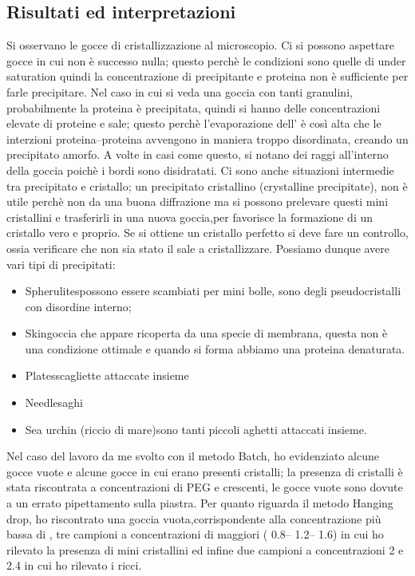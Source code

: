 \documentclass[twocolumn,a4paper,10pt]{my_report}
\begin{document}
{\subsection*{Risultati ed interpretazioni}
Si osservano le gocce di cristallizzazione al microscopio. Ci si possono aspettare gocce in cui non è successo nulla; questo perchè le condizioni sono quelle di under saturation quindi la concentrazione di precipitante e proteina non è sufficiente per farle precipitare.
Nel caso in cui si veda una goccia con tanti granulini, probabilmente la proteina è precipitata, quindi si hanno delle concentrazioni elevate di proteine e sale; questo perchè l'evaporazione dell'  è così alta che le interzioni proteina--proteina avvengono in maniera troppo disordinata, creando un precipitato amorfo. A volte in casi come questo, si notano dei raggi all'interno della goccia poichè i bordi sono disidratati. Ci sono anche situazioni intermedie tra precipitato e cristallo; un precipitato cristallino (crystalline precipitate), non è utile perchè non da una buona diffrazione ma si possono prelevare questi mini cristallini e trasferirli in una nuova goccia,per favorisce la formazione di un cristallo vero e proprio.
Se si ottiene un cristallo perfetto si deve fare un controllo, ossia verificare che non sia stato il sale a cristallizzare.
Possiamo dunque avere vari tipi di precipitati:
\begin{itemize}
 \item Spherulites\textrightarrow possono essere scambiati per mini bolle, sono degli pseudocristalli con disordine interno;
 \item Skin\textrightarrow goccia che appare ricoperta da una specie di membrana, questa non è una condizione ottimale e quando si forma abbiamo una proteina denaturata.
 \item Plates\textrightarrow scagliette attaccate insieme
 \item Needles\textrightarrow aghi
 \item Sea urchin (riccio di mare)\textrightarrow sono tanti piccoli aghetti attaccati insieme.
\end{itemize}

Nel caso del lavoro da me svolto con il metodo Batch, ho evidenziato alcune gocce vuote e alcune gocce in cui erano presenti cristalli; la presenza di cristalli è stata riscontrata a concentrazioni di PEG e  crescenti, le gocce vuote sono dovute a un errato pipettamento sulla piastra.
Per quanto riguarda il metodo Hanging drop, ho riscontrato una goccia vuota,corrispondente alla concentrazione più bassa di , tre campioni a concentrazioni di  maggiori ( \SI{0,8}{\Molar}-- \SI{1,2}{\Molar}-- \SI{1,6}{\Molar}) in cui ho rilevato la presenza di mini cristallini ed infine due campioni a concentrazioni \SI{2}{\Molar} e \SI{2,4}{\Molar} in cui ho rilevato i ricci.

}
\end{document}
